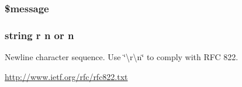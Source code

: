 \subsubsection[{\$message}]{ \$message}\label{application_2views_2errors_2cli_2error__404_8php_aaba2b6aee423b3b5e46000f90b4c8c7f}
\hypertarget{application_2views_2errors_2cli_2error__404_8php_a958071ac50ebec838e917de66e151e7e}{}
\subsubsection[{n}]{\setlength{\rightskip}{0pt plus 5cm}string {\bf r} n or n}\label{application_2views_2errors_2cli_2error__404_8php_a958071ac50ebec838e917de66e151e7e}
Newline character sequence. Use \char`\"{}\textbackslash{}r\textbackslash{}n\char`\"{} to comply with R\+F\+C 822.

\hyperlink{}{http\+://www.\+ietf.\+org/rfc/rfc822.\+txt}